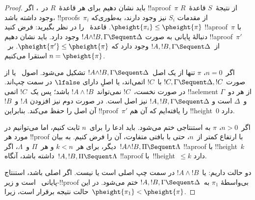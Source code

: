 \documentclass[../../../include/open-logic-section]{subfiles}
\begin{document}
\begin{proof}
باید نشان دهیم برای هر قاعدهٔ~$R$ در~، اگر !!a{proof}~$\pi$
از نتیجهٔ~$S$ قاعدهٔ~$R$ وجود داشته باشد، !!{proof}s~$\pi_i$ از مقدمات
$S_i$ نیز وجود دارند، به‌طوری‌که
$\pheight{\pi_i} \le \pheight{\pi}$. قاعدهٔ~\LeftR{\land} را در نظر
بگیرید: فرض کنید !!a{proof}~$\pi$ با دنبالهٔ پایانی به صورت
$!A \land !B, \Gamma \Sequent \Delta$ وجود دارد. باید نشان دهیم
!!a{proof}~$\pi'$ از~$!A, !B, \Gamma \Sequent \Delta$ وجود دارد که
$\pheight{\pi'} \le \pheight{\pi}$. بر~$n = \pheight{\pi}$ استقرا
می‌کنیم.

اگر~$n = 0$، $\pi$ تنها از یک اصل~$!A \land !B, \Gamma
\Sequent \Delta$ تشکیل می‌شود. اصول~ یا از صورت
$!C, \Gamma \Sequent \Delta, !C$ با~$!C$ اتمی‌اند، یا اصلِ دارای
$\lfalse$ در سمت چپ‌اند. در صورت نخست،~$!C$ نمی‌تواند~$!A \land !B$
باشد؛ پس یک~$!C$ اتمی !!a{element} از هر دو~$\Gamma$ و~$\Delta$ است و
$!A, !B, \Gamma \Sequent \Delta$ نیز اصل است. در صورت دوم نیز افزودن
$!A$ و~$!B$ آن اصل را حفظ می‌کند. بنابراین !!{proof}~$\pi'$
را یافته‌ایم که آن هم !!{height}~$0$ دارد.

اگر~$n>0$، $\pi$ به استنتاجی ختم می‌شود. باید ادعا را برای~$n$ ثابت
کنیم، اما می‌توانیم در مورد هر !!{proof} با ارتفاع کمتر از~$n$، حتی با
بافتی متفاوت، آن را فرض کنیم. به بیان دیگر، برای هر~$k<n$ و هر~$\Pi$
و~$\Lambda$، اگر~$!A \land !B, \Pi \Sequent \Lambda$ !!a{proof} با
!!{height}~$k$ داشته باشد، آنگاه~$!A, !B, \Pi \Sequent \Lambda$
!!a{proof} با~!!{height}~$\le k$ دارد.

دو حالت داریم: یا~$!A \land !B$ در سمت چپ اصلی است یا نیست. اگر اصلی
باشد، استنتاج پایانی~\LeftR{\land} است و زیر-!!{proof} بی‌واسطهٔ
$\pi_1$ به~$!A, !B, \Gamma \Sequent \Delta$ ختم می‌شود. در این حالت
نتیجه برقرار است، زیرا~$\pheight{\pi_1} < \pheight{\pi}$.


\end{proof}
\end{document}
